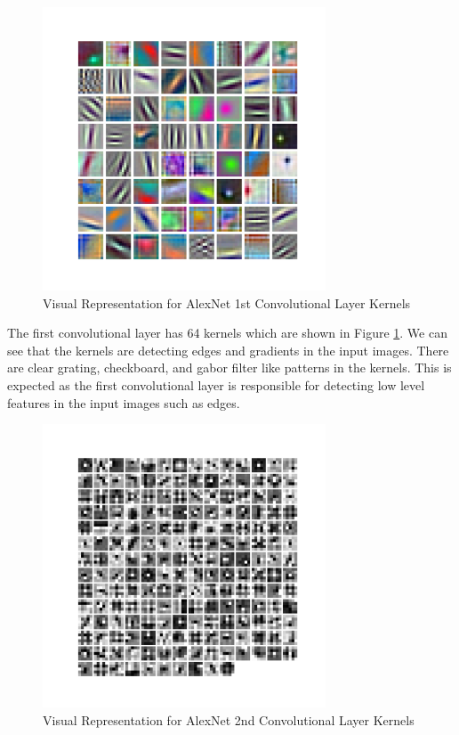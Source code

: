 \documentclass[12pt, letterpaper]{article}
\begin{document}
\begin{figure}[H]
    \centering
    \includegraphics[width=0.75\textwidth]{alexnet_conv1.png}
    \caption{Visual Representation for AlexNet 1st Convolutional Layer Kernels}
    \label{fig:alexnet_conv1}
\end{figure}

The first convolutional layer has 64 kernels which are shown in Figure \ref{fig:alexnet_conv1}. We can see that the kernels are detecting edges and gradients in the input images. There are clear grating, checkboard, and gabor filter like patterns in the kernels. This is expected as the first convolutional layer is responsible for detecting low level features in the input images such as edges.

\begin{figure}[H]
    \centering
    \includegraphics[width=0.75\textwidth]{alexnet_conv2.png}
    \caption{Visual Representation for AlexNet 2nd Convolutional Layer Kernels}
    \label{fig:alexnet_conv2}
\end{figure}
\end{document}
